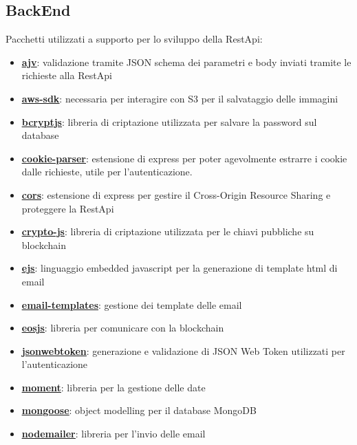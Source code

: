 \subsection{BackEnd}
Pacchetti utilizzati a supporto per lo sviluppo della RestApi:

\begin{itemize}
	\item \textbf{\underline{\href{https://ajv.js.org/}{ajv}}}: validazione tramite JSON schema dei parametri e body inviati tramite le richieste alla RestApi
	\item \textbf{\underline{\href{https://www.npmjs.com/package/aws-sdk}{aws-sdk}}}: necessaria per interagire con S3 per il salvataggio delle immagini
	\item \textbf{\underline{\href{https://www.npmjs.com/package/bcryptjs}{bcryptjs}}}: libreria di criptazione utilizzata per salvare la password sul database
	\item \textbf{\underline{\href{http://expressjs.com/en/resources/middleware/cookie-parser.html}{cookie-parser}}}: estensione di express per poter agevolmente estrarre i cookie dalle richieste, utile per l'autenticazione.
	\item \textbf{\underline{\href{https://www.npmjs.com/package/cors}{cors}}}: estensione di express per gestire il Cross-Origin Resource Sharing e proteggere la RestApi
	\item \textbf{\underline{\href{https://www.npmjs.com/package/crypto-js}{crypto-js}}}: libreria di criptazione utilizzata per le chiavi pubbliche su blockchain
	\item \textbf{\underline{\href{https://ejs.co/}{ejs}}}: linguaggio embedded javascript per la generazione di template html di email
	\item \textbf{\underline{\href{https://www.npmjs.com/package/email-templates}{email-templates}}}: gestione dei template delle email
	\item \textbf{\underline{\href{https://www.npmjs.com/package/eosjs}{eosjs}}}: libreria per comunicare con la blockchain 
	\item \textbf{\underline{\href{https://jwt.io}{jsonwebtoken}}}: generazione e validazione di JSON Web Token utilizzati per l'autenticazione
	\item \textbf{\underline{\href{https://momentjs.com}{moment}}}: libreria per la gestione delle date
	\item \textbf{\underline{\href{https://mongoosejs.com}{mongoose}}}: object modelling per il database MongoDB
	\item \textbf{\underline{\href{https://nodemailer.com/about}{nodemailer}}}: libreria per l'invio delle email

\end{itemize}
